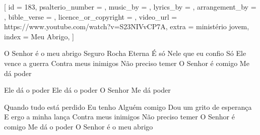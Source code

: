 [
    id                     = {183},
    psalterio_number       = {},
    music_by               = {},
    lyrics_by              = {},
    arrangement_by         = {},
    bible_verse            = {},
    licence_or_copyright   = {},
    video_url              = {https://www.youtube.com/watch?v=S23NIVvCP7A},
    extra                  = {ministério jovem},
    index                  = {Meu Abrigo},
]


\beginverse
O Senhor é o meu abrigo
Seguro Rocha Eterna
É só Nele que eu confio
Só Ele vence a guerra
Contra meus inimigos
Não preciso temer
O Senhor é comigo
Me dá poder
\endverse


\beginchorus
Ele dá o poder
Ele dá o poder
O Senhor
Me dá poder
\endchorus


\beginverse
Quando tudo está perdido
Eu tenho Alguém comigo
Dou um grito de esperança
E ergo a minha lança
Contra meus inimigos
Não preciso temer
O Senhor é comigo
Me dá o poder
O Senhor é o meu abrigo
\endverse



\endsong
